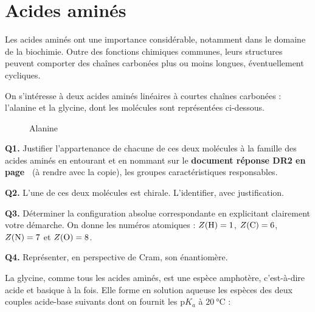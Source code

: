 \section{Acides aminés}

Les acides aminés ont une importance considérable, notamment dans le domaine de la biochimie. Outre des fonctions chimiques communes, leurs structures peuvent comporter des chaînes carbonées plus ou moins longues, éventuellement cycliques.

On s’intéresse à deux acides aminés linéaires à courtes chaînes carbonées : l’alanine et la glycine, dont les molécules sont représentées ci-dessous.


\begin{figure}[ht]
    \centering
    \begin{minipage}[t]{0.45\textwidth}
        \centering
        \caption{Glycine}
    \end{minipage}%
    \hspace{0.05\textwidth}%
    \begin{minipage}[t]{0.45\textwidth}
        \centering
        \caption{Alanine}
    \end{minipage}
\end{figure}

\medskip
\noindent
\textbf{Q1.} Justifier l’appartenance de chacune de ces deux molécules à la famille des acides aminés en entourant et en nommant sur le \textbf{document réponse DR2 en page~} (à rendre avec la copie), les groupes caractéristiques responsables.

\medskip
\noindent
\textbf{Q2.} L’une de ces deux molécules est chirale. L’identifier, avec justification.

\medskip
\noindent
\textbf{Q3.} Déterminer la configuration absolue correspondante en explicitant clairement votre démarche. On donne les numéros atomiques :
$Z(\ce{H}) = 1$, $Z(\ce{C}) = 6$, $Z(\ce{N}) = 7$ et $Z(\ce{O}) = 8$.

\medskip
\noindent
\textbf{Q4.} Représenter, en perspective de Cram, son énantiomère.

\medskip
La glycine, comme tous les acides aminés, est une espèce amphotère, c’est-à-dire acide et basique à la fois. Elle forme en solution aqueuse les espèces des deux couples acide-base suivants dont on fournit les $\mathrm{p}K_a$ à $\SI{20}{\celsius}$ :

